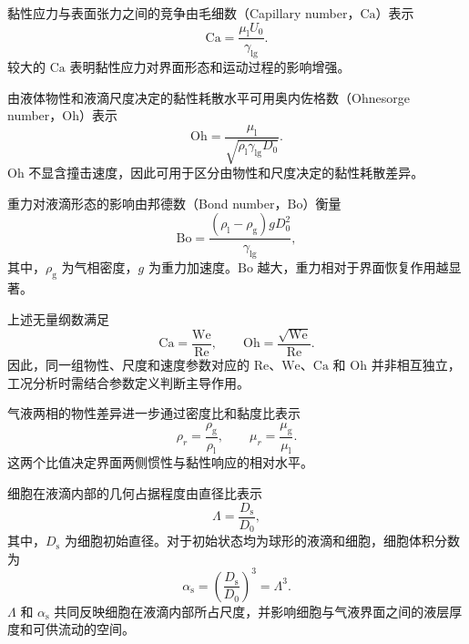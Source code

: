 黏性应力与表面张力之间的竞争由毛细数（Capillary number，$\mathrm{Ca}$）表示
\begin{equation}
\mathrm{Ca}
=
\frac{\mu_{\mathrm l}U_0}{\gamma_{\mathrm{lg}}}.
\label{eq:ch2_ca}
\end{equation}
较大的 $\mathrm{Ca}$ 表明黏性应力对界面形态和运动过程的影响增强。

由液体物性和液滴尺度决定的黏性耗散水平可用奥内佐格数（Ohnesorge number，$\mathrm{Oh}$）表示
\begin{equation}
\mathrm{Oh}
=
\frac{\mu_{\mathrm l}}
{\sqrt{\rho_{\mathrm l}\gamma_{\mathrm{lg}}D_0}}.
\label{eq:ch2_oh}
\end{equation}
$\mathrm{Oh}$ 不显含撞击速度，因此可用于区分由物性和尺度决定的黏性耗散差异。

重力对液滴形态的影响由邦德数（Bond number，$\mathrm{Bo}$）衡量
\begin{equation}
\mathrm{Bo}
=
\frac{\left(\rho_{\mathrm l}-\rho_{\mathrm g}\right)gD_0^2}
{\gamma_{\mathrm{lg}}},
\label{eq:ch2_bo}
\end{equation}
其中，$\rho_{\mathrm g}$ 为气相密度，$g$ 为重力加速度。$\mathrm{Bo}$ 越大，重力相对于界面恢复作用越显著。

上述无量纲数满足
\begin{equation}
\mathrm{Ca}
=
\frac{\mathrm{We}}{\mathrm{Re}},
\qquad
\mathrm{Oh}
=
\frac{\sqrt{\mathrm{We}}}{\mathrm{Re}}.
\label{eq:ch2_dimensionless_relation}
\end{equation}
因此，同一组物性、尺度和速度参数对应的 $\mathrm{Re}$、$\mathrm{We}$、$\mathrm{Ca}$ 和 $\mathrm{Oh}$ 并非相互独立，工况分析时需结合参数定义判断主导作用。

气液两相的物性差异进一步通过密度比和黏度比表示
\begin{equation}
\rho_r
=
\frac{\rho_{\mathrm g}}{\rho_{\mathrm l}},
\qquad
\mu_r
=
\frac{\mu_{\mathrm g}}{\mu_{\mathrm l}}.
\label{eq:ch2_property_ratio}
\end{equation}
这两个比值决定界面两侧惯性与黏性响应的相对水平。

细胞在液滴内部的几何占据程度由直径比表示
\begin{equation}
\Lambda
=
\frac{D_{\mathrm s}}{D_0},
\label{eq:ch2_size_ratio}
\end{equation}
其中，$D_{\mathrm s}$ 为细胞初始直径。对于初始状态均为球形的液滴和细胞，细胞体积分数为
\begin{equation}
\alpha_{\mathrm s}
=
\left(\frac{D_{\mathrm s}}{D_0}\right)^3
=
\Lambda^3.
\label{eq:ch2_volume_fraction}
\end{equation}
$\Lambda$ 和 $\alpha_{\mathrm s}$ 共同反映细胞在液滴内部所占尺度，并影响细胞与气液界面之间的液层厚度和可供流动的空间。

